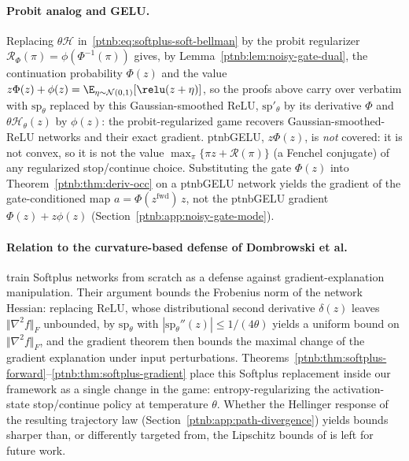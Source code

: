 \paragraph{Probit analog and GELU.}
Replacing $\theta\mathcal{H}$ in~\eqref{ptnb:eq:softplus-soft-bellman} by the probit regularizer
$\mathcal{R}_\Phi(\pi) = \phi(\Phi^{-1}(\pi))$ gives, by Lemma~\ref{ptnb:lem:noisy-gate-dual}, the
continuation probability $\Phi(z)$ and the value $z\Phi(z) + \phi(z) = \E_{\eta \sim
    \mathcal{N}(0,1)}[\relu(z + \eta)]$, so the proofs above carry over verbatim with
$\mathrm{sp}_\theta$ replaced by this Gaussian-smoothed ReLU, $\mathrm{sp}'_\theta$ by its
derivative $\Phi$ and $\theta\mathcal{H}_\theta(z)$ by $\phi(z)$: the probit-regularized game
recovers Gaussian-smoothed-ReLU networks and their exact gradient. \acs{ptnbGELU}, $z\Phi(z)$, is
\emph{not} covered: it is not convex, so it is not the value $\max_\pi\{\pi z + \mathcal{R}(\pi)\}$
(a Fenchel conjugate) of any regularized stop/continue choice. Substituting the gate $\Phi(z)$ into
Theorem~\ref{ptnb:thm:deriv-occ} on a \acs{ptnbGELU} network yields the gradient of the gate-conditioned map
$a = \Phi(z^{\mathrm{fwd}})\, z$, not the \acs{ptnbGELU} gradient $\Phi(z) + z\phi(z)$
(Section~\ref{ptnb:app:noisy-gate-mode}).

\paragraph{Relation to the curvature-based defense of Dombrowski et
al.}\label{ptnb:app:softplus-dombrowski}
\textcite{Dombrowski2020} train Softplus networks from scratch as a defense against
gradient-explanation manipulation. Their argument bounds the Frobenius norm of the network Hessian:
replacing $\mathrm{ReLU}$, whose distributional second derivative $\delta(z)$ leaves $\Vert
    \nabla^2 f \Vert_F$ unbounded, by $\mathrm{sp}_\theta$ with $|\mathrm{sp}_\theta''(z)| \le
    1/(4\theta)$ yields a uniform bound on $\Vert \nabla^2 f \Vert_F$, and the gradient theorem then
bounds the maximal change of the gradient explanation under input perturbations.
Theorems~\ref{ptnb:thm:softplus-forward}--\ref{ptnb:thm:softplus-gradient} place this Softplus replacement
inside our framework as a single change in the game: entropy-regularizing the activation-state
stop/continue policy at temperature $\theta$. Whether the Hellinger response of the resulting
trajectory law (Section~\ref{ptnb:app:path-divergence}) yields bounds sharper than, or differently
targeted from, the Lipschitz bounds of \textcite{Dombrowski2020} is left for future work.
\par\medskip
